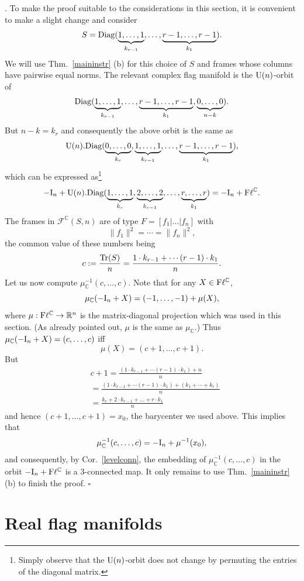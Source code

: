 \documentclass[12pt]{amsart}
\theoremstyle{definition}
\theoremstyle{remark}
\newcommand{\RR}{\mathbb R}
\newcommand{\CC}{\mathbb C}
\newcommand{\Fl}{{\mathrm{F\ell}}}
\begin{document}
. To make the proof suitable to the considerations in this section,  
it is convenient to make a slight change and consider 
$$S={\rm Diag} (\underbrace{1 , \dots, 1}_{k_{r-1}},
\dots,
\underbrace{{r-1}, \dots, {r-1}}_{k_1}).$$
We will use Thm.~\ref{maininstr} (b) for this choice of $S$ and frames whose columns have pairwise equal norms. The relevant complex flag manifold is the ${\rm U}(n)$-orbit of 
$${\rm Diag} (\underbrace{1 , \dots, 1}_{k_{r-1}},
\dots,
\underbrace{{r-1}, \dots, {r-1}}_{k_1}, \underbrace{{0}, \dots, {0}}_{n-k}).$$
But $n-k=k_r$ and consequently the above orbit is the same as  
$${\rm U}(n).{\rm Diag} ( \underbrace{{0}, \dots, {0}}_{k_r}, \underbrace{1 , \dots, 1}_{k_{r-1}},
\dots,
\underbrace{{r-1}, \dots, {r-1}}_{k_1}),$$
which can be expressed as\footnote{Simply observe that the ${\rm U}(n)$-orbit does not change by permuting the entries of the diagonal matrix.}   
$$-{\rm I}_n+{\rm U}(n).{\rm Diag} ( \underbrace{1, \dots, 1}_{k_r}, \underbrace{2 , \dots, 2}_{k_{r-1}},
\dots, \underbrace{{r}, \dots, {r}}_{k_1})=-{\rm I}_n+\Fl^\CC.$$
The frames in ${\mathcal F}^\CC(S, n)$ are of type $F=[f_1 | \ldots | f_n]$ with
$$\|f_1\|^2 = \cdots = \|f_n\|^2,$$
the common value of these numbers being $$c:=\frac{{\rm Tr}(S)}{n}=
\frac{1\cdot k_{r-1} + \cdots (r-1)\cdot k_1}{n}.$$ 
Let us now compute $\mu_\CC^{-1}(c, \dots , c)$. 
Note that for any $X\in {\rm F}\ell^\CC$, 
$$\mu_\CC (-{\rm I}_n +X) =(-1, \ldots , -1) +\mu(X),$$
where $\mu:{\rm F}\ell^\CC \to \RR^n$ is the matrix-diagonal projection which was used in this section. (As already pointed out,
$\mu$ is the same as $\mu_\CC$.)  
Thus $\mu_\CC(-{\rm I}_n +X)=(c, \ldots, c)$ iff
$$\mu(X)=(c+1, \ldots, c+1).$$
But
\begin{align*}{}&c+1=\frac{(1\cdot k_{r-1} + \cdots (r-1)\cdot k_1) +n}{n}\\
{}& =\frac{(1\cdot k_{r-1} + \cdots (r-1)\cdot k_1) +(k_1+ \cdots +k_r)}{n}\\
{}& =\frac{k_r+ 2\cdot k_{r-1} + \dots + r\cdot k_1}{n}\end{align*}
and hence $(c+1, \ldots, c+1) = x_0$, the barycenter we used above. 
This implies that $$\mu_\CC^{-1}(c, \dots , c)=-{\rm I}_n +\mu^{-1}(x_0),$$
and consequently, by Cor.~\ref{levelconn}, the embedding of  $\mu_\CC^{-1}(c, \dots , c)$ in the orbit $-{\rm I}_n +{\rm F}\ell^\CC$ is a 3-connected map.
It only remains to use Thm.~\ref{maininstr} (b) to finish the proof. $\square$


\section{Real flag manifolds} \label{realflag}
\end{document}
